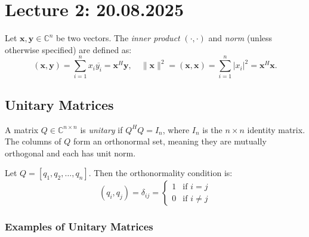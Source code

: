 \section{Lecture 2: 20.08.2025}

Let $\mathbf{x}, \mathbf{y} \in \mathbb{C}^n$ be two vectors. The \emph{inner product} $(\cdot, \cdot)$ and \emph{norm} (unless otherwise specified) are defined as:
\begin{equation}
    (\mathbf{x}, \mathbf{y}) = \sum_{i=1}^n x_i \overline{y_i} = \mathbf{x}^H \mathbf{y}, \quad \|\mathbf{x}\|^2 = (\mathbf{x}, \mathbf{x}) = \sum_{i=1}^n |x_i|^2 = \mathbf{x}^H \mathbf{x}.
\end{equation}

\subsection{Unitary Matrices}

A matrix $Q \in \mathbb{C}^{n \times n}$ is \emph{unitary} if $Q^H Q = I_n$, where $I_n$ is the $n \times n$ identity matrix. The columns of $Q$ form an orthonormal set, meaning they are mutually orthogonal and each has unit norm.

Let $Q = [q_1, q_2, \ldots, q_n]$. Then the orthonormality condition is:
\begin{equation}
    (q_i, q_j) = \delta_{ij} = \begin{cases}
        1 & \text{if } i = j    \\
        0 & \text{if } i \neq j
    \end{cases}
\end{equation}

\subsubsection{Examples of Unitary Matrices}

